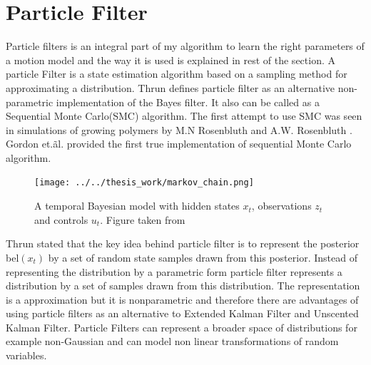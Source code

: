 \documentclass[12pt]{dalcsthesis}
\begin{document}
\section{Particle Filter}
Particle filters is an integral part of my algorithm to learn the right parameters of a motion model and the way it is used is explained in rest of the section. A particle Filter is a state estimation algorithm based on a sampling method for approximating a distribution. Thrun \cite{thrun2005probabilistic} defines particle filter as an alternative non-parametric implementation of the Bayes filter. It also can be called as a Sequential Monte Carlo(SMC) algorithm. The first attempt to use SMC was seen in simulations of growing polymers by M.N Rosenbluth and A.W. Rosenbluth \cite{rosenbluth1955monte}. Gordon et.\~al. \cite{gordon1993novel} provided the first true implementation of sequential Monte Carlo algorithm. 

\begin{figure}
  \centering
     {\texttt{[image: ../../thesis\_work/markov\_chain.png]}}
  \caption{\label{fig-Markov Chain} A temporal Bayesian model with hidden states $x_{t}$, observations $z_{t}$ and controls $u_{t}$. Figure taken from \cite{thrun2005probabilistic}}
\end{figure}

Thrun \cite{thrun2005probabilistic} stated that the key idea behind particle filter is to represent the posterior bel$(x_{t})$ by a set of random state samples drawn from this posterior. Instead of representing the distribution by a parametric form particle filter represents a distribution by a set of samples drawn from this distribution. 	The representation is a approximation but it is nonparametric and therefore there are advantages of using particle filters as an alternative to Extended Kalman Filter and Unscented Kalman Filter. Particle Filters can represent a broader space of distributions for example non-Gaussian and can model non linear transformations of random variables. 
\end{document}
